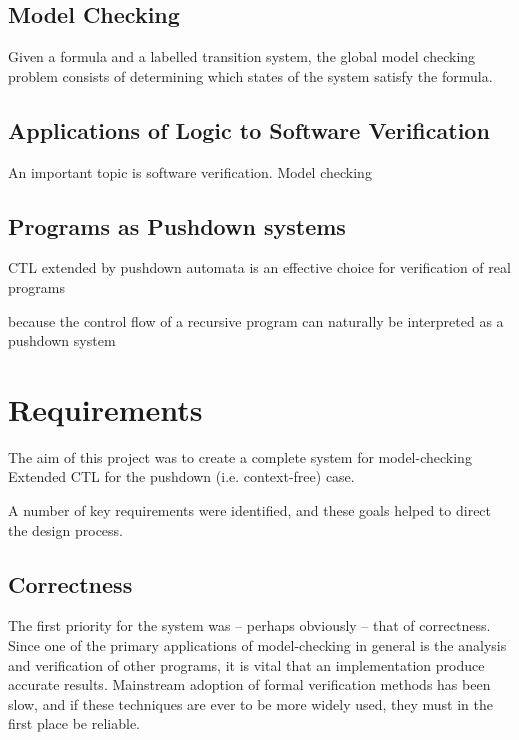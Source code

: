 \documentclass[11pt]{article}
\theoremstyle{definition}
\begin{document}


\subsection{Model Checking}

Given a formula and a labelled transition system, the global model checking
problem consists of determining which states of the system satisfy the formula.

\subsection{Applications of Logic to Software Verification}

An important topic 
is software verification.
Model checking



\subsection{Programs as Pushdown systems}

CTL extended by pushdown automata is an effective choice for verification of real programs

because the control flow of a recursive program can naturally be 
interpreted
as a pushdown system

\section{Requirements}

The aim of this project was to create a complete system for model-checking
Extended CTL for the pushdown (i.e. context-free) case. 

A number of key requirements were identified, and these goals helped to direct
the design process. 


\subsection{Correctness}
The first priority for the system was -- perhaps obviously -- that of
correctness. Since one of the primary applications of model-checking in general
is the analysis and verification of other programs, it is vital that
an implementation produce accurate results. Mainstream adoption of formal
verification methods has been slow,\cite{mitra2008strategies} and if these
techniques are ever to be more widely used, they must in the first place be
reliable.
\end{document}
